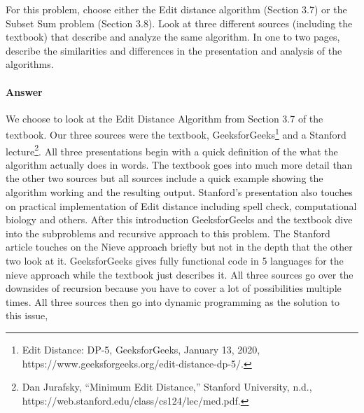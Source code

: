 \documentclass{article}
\begin{document}

\nextprob
{}

For this problem, choose either the Edit distance algorithm (Section 3.7) or the
Subset Sum problem (Section 3.8). Look at three different sources (including the
textbook) that describe
and analyze the same algorithm. In one to two pages, describe the similarities
and differences in the presentation and analysis of the algorithms.

\paragraph{Answer}


We choose to look at the Edit Distance Algorithm from Section 3.7 of the textbook. Our three sources were the textbook, GeeksforGeeks\footnote{Edit Distance: DP-5, GeeksforGeeks, January 13, 2020, https://www.geeksforgeeks.org/edit-distance-dp-5/.} and a Stanford lecture\footnote{Dan Jurafsky, “Minimum Edit Distance,” Stanford University, n.d., https://web.stanford.edu/class/cs124/lec/med.pdf.}. All  three presentations begin with a quick definition of the what the algorithm actually does in words. The textbook goes into much more detail than the other two sources but all sources include a quick example showing the algorithm working and the resulting output. Stanford's presentation also touches on practical implementation of Edit distance including spell check, computational biology and others. After this introduction GeeksforGeeks and the textbook dive into the subproblems and recursive approach to this problem. The Stanford article touches on the Nieve approach briefly but not in the depth that the other two look at it. GeeksforGeeks gives fully functional code in 5 languages for the nieve approach while the textbook just describes it. All three sources go over the downsides of recursion because you have to cover a lot of possibilities multiple times. All three sources then go into dynamic programming as the solution to this issue, 

\end{document}
